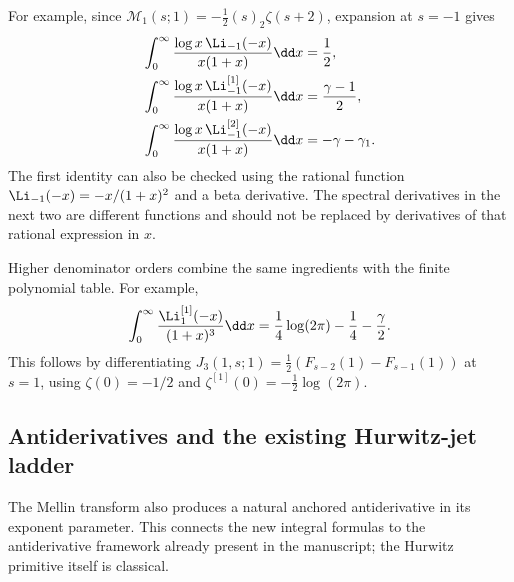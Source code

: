 For example, since
$\mathcal M_1(s;1)=-\tfrac12(s)_2\zeta(s+2)$,
expansion at $s=-1$ gives
\begin{align}
 \int_0^\infty\frac{\log x\,\Li_{-1}(-x)}{x(1+x)}\dd x
      &=\frac12,\label{mld:eq:resonant-example0}\\
 \int_0^\infty\frac{\log x\,\Li_{-1}^{[1]}(-x)}{x(1+x)}\dd x
      &=\frac{\gamma-1}{2},\label{mld:eq:resonant-example1}\\
 \int_0^\infty\frac{\log x\,\Li_{-1}^{[2]}(-x)}{x(1+x)}\dd x
      &=-\gamma-\gamma_1.\label{mld:eq:resonant-example2}
\end{align}
The first identity can also be checked using the rational function
$\Li_{-1}(-x)=-x/(1+x)^2$ and a beta derivative. The spectral derivatives in the next two are different functions and should not be replaced by derivatives of that rational expression in $x$.

Higher denominator orders combine the same ingredients with the finite polynomial table. For example,
\begin{equation}\label{mld:eq:third-pole-example}
 \int_0^\infty\frac{\Li_1^{[1]}(-x)}{(1+x)^3}\dd x
       =\frac14\log(2\pi)-\frac14-\frac\gamma2.
\end{equation}
This follows by differentiating
$J_3(1,s;1)=\tfrac12(F_{s-2}(1)-F_{s-1}(1))$
at $s=1$, using $\zeta(0)=-1/2$ and
$\zeta^{[1]}(0)=-\tfrac12\log(2\pi)$.

\subsection{Antiderivatives and the existing Hurwitz-jet ladder}

The Mellin transform also produces a natural anchored antiderivative in its exponent parameter. This connects the new integral formulas to the antiderivative framework already present in the manuscript; the Hurwitz primitive itself is classical.

